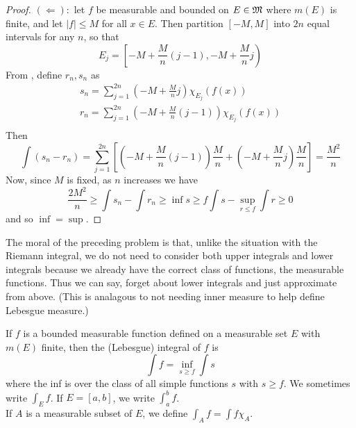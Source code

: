 \begin{pblm}
\begin{proof}
	\noindent $(\Leftarrow): $ let $f$ be measurable and bounded on $E \in \mathfrak{M}$ where 
	$m(E)$ is finite, and let $|f| \le M$ for all $x \in E$. Then partition 
	$[-M, M]$ into $2n$ equal intervals for any $n$, so that 
	\begin{equation*}
		E_j = \left[\left.-M + \frac{M}{n}(j-1), -M + \frac{M}{n}j\right.\right)
	\end{equation*}
	From , define $r_n, s_n$ as 
	\begin{equation*}
	\begin{array}{c}
		s_n = \sum\limits_{j=1}^{2n} (-M + \frac{M}{n}j) \chi_{E_j}(f(x)) \\
		r_n = \sum\limits_{j=1}^{2n} (-M + \frac{M}{n}(j-1)) \chi_{E_j}(f(x)) \\
	\end{array}
	\end{equation*}
	Then 
	\begin{equation*}
		\int(s_n-r_n) = \sum\limits_{j=1}^{2n}\left[\left(-M+\frac{M}{n}(j-1)\right)\frac{M}{n} + 
				\left(-M + \frac{M}{n}j\right)\frac{M}{n}\right] 
				= \frac{M^2}{n}
	\end{equation*}
	Now, since $M$ is fixed, as $n$ increases we have 
	\begin{equation*}
		\frac{2M^2}{n} \ge \int s_n - \int r_n \ge \inf\limits{s\ge f}\int s - \sup\limits_{r\le f}\int r \ge 0
	\end{equation*}
	and so $\inf = \sup$. 
\end{proof}
\end{pblm}

\begin{rmk} %
	The moral of the preceding problem is that, unlike the situation with the Riemann 
	integral, we do not need to consider both upper integrals and lower integrals because 
	we already have the correct class of functions, the measurable functions. Thus we can 
	say, forget about lower integrals and just approximate from above. (This is analagous 
	to not needing inner measure to help define Lebesgue measure.)
\end{rmk}

\begin{defn}\label{d:lebesgueintegral}%
	If $f$ is a bounded measurable function defined on a measurable set $E$ with $m(E)$ 
	finite, then the (Lebesgue) integral of $f$ is 
	\begin{equation*}
		\int f = \inf\limits_{s \ge f}\int s
	\end{equation*}
	where the inf is over the class of all simple functions $s$ with $s \ge f$. We sometimes 
	write $\int_E f$. If $E = [a, b]$, we write $\int_a^b f$.\\ 
	If $A$ is a measurable subset of $E$, we define $\int_A f = \int f\chi_A$. 
\end{defn}

